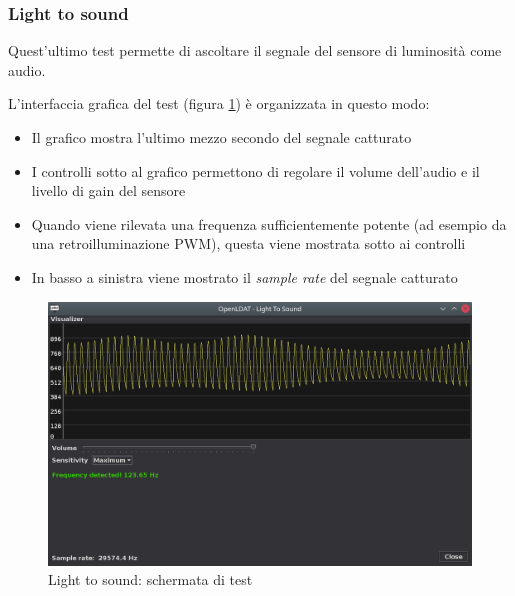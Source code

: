 \subsubsection{Light to sound}
Quest'ultimo test permette di ascoltare il segnale del sensore di luminosità come audio.

L'interfaccia grafica del test (figura \ref{fig:gui_lighttosound_results}) è organizzata in questo modo:\begin{itemize}
	\item Il grafico mostra l'ultimo mezzo secondo del segnale catturato
	\item I controlli sotto al grafico permettono di regolare il volume dell'audio e il livello di gain del sensore
	\item Quando viene rilevata una frequenza sufficientemente potente (ad esempio da una retroilluminazione PWM), questa viene mostrata sotto ai controlli
	\item In basso a sinistra viene mostrato il \textit{sample rate} del segnale catturato
\end{itemize}

\begin{figure}[H]
	\centering
	\includegraphics[width=\textwidth]{Applicazione_files/gui_lighttosound_results.png}
	\caption{Light to sound: schermata di test}
	\label{fig:gui_lighttosound_results}
\end{figure}


